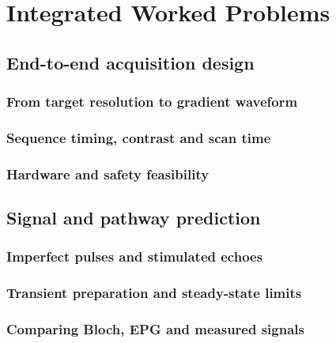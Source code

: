 \chapter{Integrated Worked Problems}
\label{ch:27}

\section{End-to-end acquisition design}
\label{sec:27:end-to-end-acquisition-design}
\subsection{From target resolution to gradient waveform}
\subsection{Sequence timing, contrast and scan time}
\subsection{Hardware and safety feasibility}

\section{Signal and pathway prediction}
\label{sec:27:signal-and-pathway-prediction}
\subsection{Imperfect pulses and stimulated echoes}
\subsection{Transient preparation and steady-state limits}
\subsection{Comparing Bloch, EPG and measured signals}

